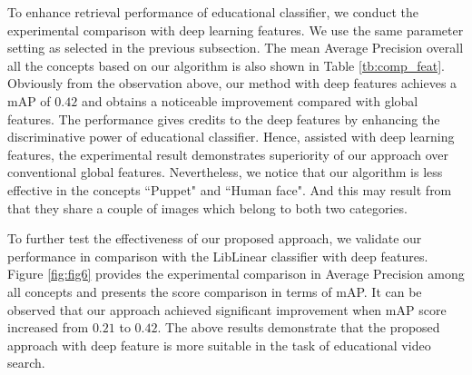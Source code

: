 \documentclass[11pt,twocolumn,twoside]{IEEEtran}
\begin{document}
To enhance retrieval performance of educational classifier, we conduct the experimental comparison with deep learning features.
We use the same parameter setting as selected in the previous subsection.
The mean Average Precision overall all the concepts based on our algorithm
is also shown in Table \ref{tb:comp_feat}. Obviously from the observation above, our method with deep features achieves a mAP of
$0.42$ and obtains a noticeable improvement compared with global features.
The performance gives credits to the deep features by enhancing the discriminative power of educational classifier. Hence,
assisted with deep learning features, the experimental result demonstrates superiority of our approach over conventional global features.
Nevertheless, we notice that our algorithm is less effective
in the concepts ``Puppet" and ``Human face". And
this may result from that they share a couple of images which belong to both two categories.

To further test the effectiveness of our proposed approach, we validate our performance in comparison with the LibLinear classifier \cite{Liblinear}
with deep features. Figure \ref{fig:fig6} provides the experimental comparison in Average Precision among all concepts and presents the score comparison in terms of mAP. It can be observed that our approach achieved significant improvement when mAP score increased from $0.21$ to $0.42$.
The above results demonstrate that the proposed approach with deep feature is more suitable in the task of educational video search.
%
\end{document}
